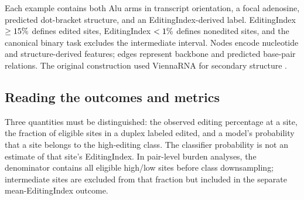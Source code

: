 \documentclass[9pt,twoside]{pnas-new}
\begin{document}
Each example contains both Alu arms in transcript orientation, a focal adenosine, predicted dot-bracket structure, and an EditingIndex-derived label. EditingIndex $\geq15{}\%$ defines edited sites, EditingIndex $<1{}\%$ defines nonedited sites, and the canonical binary task excludes the intermediate interval. Nodes encode nucleotide and structure-derived features; edges represent backbone and predicted base-pair relations. The original construction used ViennaRNA for secondary structure \cite{Lorenz2011}.

\subsection*{Reading the outcomes and metrics}

Three quantities must be distinguished: the observed editing percentage at a site, the fraction of eligible sites in a duplex labeled edited, and a model's probability that a site belongs to the high-editing class. The classifier probability is not an estimate of that site's EditingIndex. In pair-level burden analyses, the denominator contains all eligible high/low sites before class downsampling; intermediate sites are excluded from that fraction but included in the separate mean-EditingIndex outcome.
\end{document}
